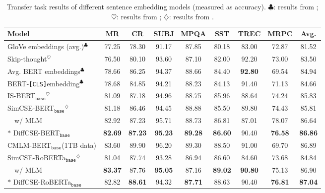 \documentclass[11pt]{article}
\newcommand{\ba}{$_\texttt{base}$\xspace}
\newcommand\tf[1]{\textbf{#1}}
\newcommand\ttt[1]{\texttt{#1}}
\newcommand{\tableindent}{~~}
\newcommand{\cls}{\ttt{[CLS]}}
\begin{document}
\begin{table*}[ht]
    \begin{center}
    \centering
    \small

    \begin{tabular}{lcccccccc}
    \toprule
       \tf{Model} & \tf{MR} & \tf{CR} & \tf{SUBJ} & \tf{MPQA} & \tf{SST} & \tf{TREC} & \tf{MRPC} & \tf{Avg.}\\
    \midrule
        GloVe embeddings (avg.)$^\clubsuit$ & 77.25&    78.30&  91.17&  87.85&  80.18&  83.00& 72.87 & 81.52\\
        Skip-thought$^\heartsuit$ &  76.50& 80.10&  93.60&  87.10&  82.00&  92.20&  73.00& 83.50  \\
        \midrule
        Avg. BERT embeddings$^\clubsuit$ & 78.66 & 86.25 & 94.37 & 88.66 & 84.40 & \tf{92.80} & 69.54 & 84.94 \\
        BERT-\cls embedding$^\clubsuit$ & 78.68 & 84.85 & 94.21 & 88.23 & 84.13 & 91.40 & 71.13 & 84.66 \\
        IS-BERT\ba$^\heartsuit$ & 81.09 & 87.18 & 94.96 & 88.75 & 85.96 & 88.64 & 74.24 & 85.83 \\
        SimCSE-BERT\ba$^\diamondsuit$ & 81.18&	86.46&	94.45&	88.88&	85.50&	89.80&	74.43&	85.81\\
        \tableindent w/ MLM & 82.92&	87.23&	95.71&	88.73&	86.81&	87.01&	78.07& 86.64\\
        $*$ DiffCSE-BERT\ba & \bf 82.69 & \bf 87.23 & \bf 95.23 & \bf 89.28 & \bf 86.60 & 90.40 & \bf 76.58 & \bf 86.86\\
        \midrule
        CMLM-BERT\ba {\scriptsize(1TB data)} & 83.60 & 89.90 & 96.20 & 89.30 & 88.50 & 91.00 & 69.70 & 86.89 \\
        \midrule
        SimCSE-RoBERTa\ba$^\diamondsuit$ & 81.04 &	87.74 &	93.28 &	86.94	&86.60	&84.60	&73.68 &84.84 \\
        \tableindent w/ MLM & \tf{83.37}& 	87.76& 	\tf{95.05}	& 87.16	& \tf{89.02}	& \tf{90.80}	& 75.13 & 86.90\\
        $*$ DiffCSE-RoBERTa\ba & 82.82 & \bf 88.61 & 94.32 & \bf 87.71 & 88.63 & 90.40 & \bf 76.81 & \bf 87.04 \\
    \bottomrule
    \end{tabular}
    \end{center}
\vspace{-3.5mm}
    \caption{
        Transfer task results of different sentence embedding models (measured as accuracy). $\clubsuit$: results from \citet{reimers2019sentence};
        $\heartsuit$: results from \citet{zhang2020unsupervised};
        $\diamondsuit$: results from \citet{gao2021simcse}.
    }
    \vspace{-3mm}
    \label{tab:main_transfer}
\end{table*}
 
\end{document}
